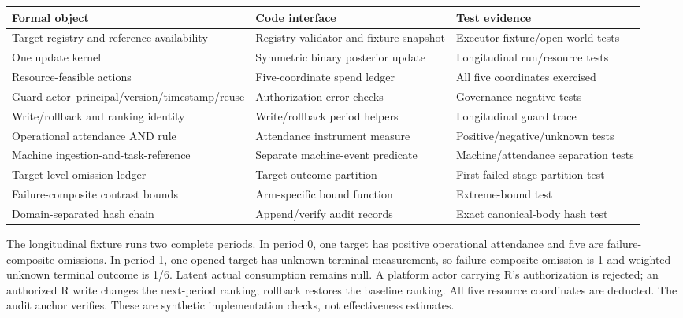 \documentclass[
  11pt]{article}
\begin{document}
\begin{longtable}[]{@{}
  >{\raggedright\arraybackslash}p{}
  >{\raggedright\arraybackslash}p{}
  >{\raggedright\arraybackslash}p{}@{}}
\toprule\noalign{}
\begin{minipage}[b]{\linewidth}\raggedright
Formal object
\end{minipage} & \begin{minipage}[b]{\linewidth}\raggedright
Code interface
\end{minipage} & \begin{minipage}[b]{\linewidth}\raggedright
Test evidence
\end{minipage} \\
\midrule\noalign{}
\endhead
\bottomrule\noalign{}
\endlastfoot
Target registry and reference availability & Registry validator and
fixture snapshot & Executor fixture/open-world tests \\
One update kernel & Symmetric binary posterior update & Longitudinal
run/resource tests \\
Resource-feasible actions & Five-coordinate spend ledger & All five
coordinates exercised \\
Guard actor--principal/version/timestamp/reuse & Authorization error
checks & Governance negative tests \\
Write/rollback and ranking identity & Write/rollback period helpers &
Longitudinal guard trace \\
Operational attendance AND rule & Attendance instrument measure &
Positive/negative/unknown tests \\
Machine ingestion-and-task-reference & Separate machine-event predicate
& Machine/attendance separation tests \\
Target-level omission ledger & Target outcome partition &
First-failed-stage partition test \\
Failure-composite contrast bounds & Arm-specific bound function &
Extreme-bound test \\
Domain-separated hash chain & Append/verify audit records & Exact
canonical-body hash test \\
\end{longtable}

The longitudinal fixture runs two complete periods. In period 0, one
target has positive operational attendance and five are
failure-composite omissions. In period 1, one opened target has unknown
terminal measurement, so failure-composite omission is 1 and weighted
unknown terminal outcome is 1/6. Latent actual consumption remains null.
A platform actor carrying R's authorization is rejected; an authorized R
write changes the next-period ranking; rollback restores the baseline
ranking. All five resource coordinates are deducted. The audit anchor
verifies. These are synthetic implementation checks, not effectiveness
estimates.
\end{document}
